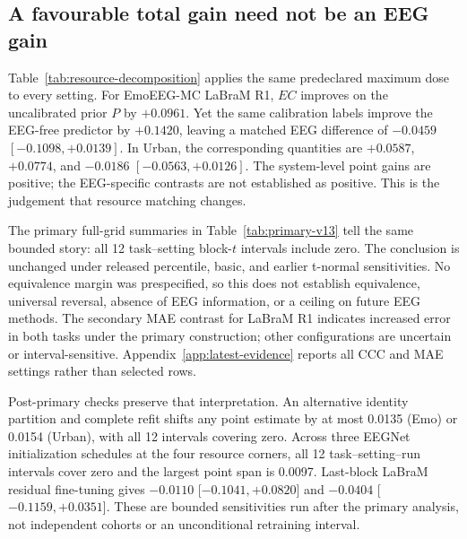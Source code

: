 \subsection{A favourable total gain need not be an EEG gain}

Table~\ref{tab:resource-decomposition} applies the same predeclared maximum dose
to every setting. For EmoEEG-MC LaBraM R1, $EC$ improves on the uncalibrated
prior $P$ by $+0.0961$. Yet the same calibration labels improve the EEG-free
predictor by $+0.1420$, leaving a matched EEG difference of $-0.0459$
$[-0.1098,+0.0139]$. In Urban, the corresponding quantities are $+0.0587$,
$+0.0774$, and $-0.0186$ $[-0.0563,+0.0126]$. The system-level point gains are
positive; the EEG-specific contrasts are not established as positive. This is
the judgement that resource matching changes.


The primary full-grid summaries in Table~\ref{tab:primary-v13} tell the same
bounded story: all 12 task--setting block-$t$ intervals include zero. The
conclusion is unchanged under released percentile, basic, and earlier t-normal
sensitivities. No equivalence margin was prespecified, so this does not establish
equivalence, universal reversal, absence of EEG information, or a ceiling on
future EEG methods. The secondary MAE contrast for LaBraM R1 indicates increased
error in both tasks under the primary construction; other configurations are
uncertain or interval-sensitive. Appendix~\ref{app:latest-evidence} reports all
CCC and MAE settings rather than selected rows.

Post-primary checks preserve that interpretation. An alternative identity
partition and complete refit shifts any point estimate by at most 0.0135 (Emo)
or 0.0154 (Urban), with all 12 intervals covering zero. Across three EEGNet
initialization schedules at the four resource corners, all 12 task--setting--run
intervals cover zero and the largest point span is 0.0097. Last-block LaBraM
residual fine-tuning gives $-0.0110$ [$-0.1041,+0.0820$] and $-0.0404$
[$-0.1159,+0.0351$]. These are bounded sensitivities run after the primary
analysis, not independent cohorts or an unconditional retraining interval.

